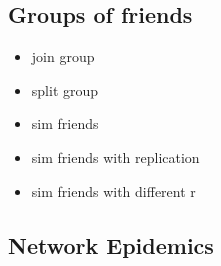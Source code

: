 \documentclass[12pt]{article}
\begin{document}
\subsection{Groups of friends}

\singlespacing
\begin{itemize}

\item{\large join group}

\vspace{1cm}

\item{\large split group}

\vspace{1cm}

\item{\large sim friends}

\vspace{1cm}

\item{\large sim friends with replication}

\vspace{1cm}


\item{\large sim friends with different r }

\vspace{1cm}

\end{itemize}



\subsection{Network Epidemics}
\end{document}
